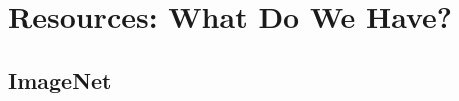 \documentclass[runningheads]{llncs}
\newcommand{\cs}[1]{\textcolor{PineGreen}{\emph{//cs: #1//}}}
\newcommand{\refexp}[1]{\textsl{#1}}
\begin{document}
%
%


\section{Resources: What Do We Have?}
\label{sec:resources}

\subsection{ImageNet}
\end{document}
